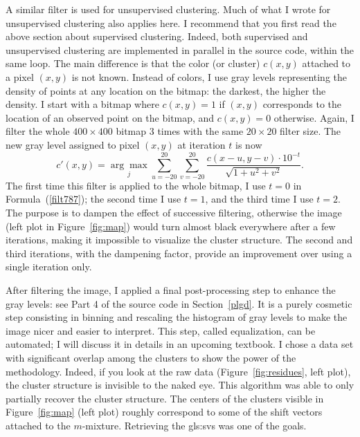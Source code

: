 \documentclass[10pt]{article}
\begin{document}
\noindent A similar filter is used for unsupervised clustering. Much of what I wrote for unsupervised clustering also applies here. I recommend that you first read the above section about supervised clustering. Indeed, both supervised and unsupervised clustering are implemented in parallel in the source code, within the same loop. The main difference is that the color (or cluster) $c(x,y)$ attached to a pixel $(x,y)$ is not known. Instead of colors, I use gray levels representing the density of points at any location on the bitmap: the darkest, the higher the density. I start with a bitmap where $c(x,y)=1$ if $(x,y)$ corresponds to the location of an observed point on the bitmap, and $c(x,y)=0$ otherwise. Again, I filter the whole $400\times 400$ bitmap 3 times with the same 
$20\times 20$ filter size. The new gray level assigned to pixel $(x,y)$ at iteration $t$ is now
\begin{equation}
c'(x,y)=\underset{j}{\arg \max} \sum_{u=-20}^{20}\sum_{v=-20}^{20}\frac{c(x-u,y-v)\cdot 10^{-t}}{\sqrt{1+u^2+v^2}}. \label{filt787}
\end{equation}
The first time this filter is applied to the whole bitmap, I use $t=0$ in Formula~(\ref{filt787}); the second time I use $t=1$, and the third time I use $t=2$. The purpose is to dampen the effect of successive filtering, otherwise the image (left plot in Figure~\ref{fig:map}) would turn almost black everywhere after a few iterations, making it impossible to visualize the cluster structure. The second and third iterations, with the dampening factor, provide an improvement over using a single iteration only. 

After filtering the image, I applied a final post-processing step to enhance the gray levels: see Part 4 of the source code in Section~\ref{plgd}. It is a purely cosmetic step consisting in binning and rescaling the histogram of gray levels to make the image nicer and easier to interpret. This step, called equalization,  can be automated; I will discuss it in details in an upcoming textbook. I chose
a data set with significant overlap among the clusters to show the power of the methodology. Indeed, if you look at the raw data (Figure~\ref{fig:residues}, left plot), the 
cluster structure is invisible to the naked eye. This algorithm was able to only partially recover the cluster structure. The centers of the clusters visible in 
Figure~\ref{fig:map} (left plot) roughly correspond to some of the 
shift vectors attached to the $m$-mixture. Retrieving the 
\glspl{gls:sv} was one of the goals. 
\end{document}
